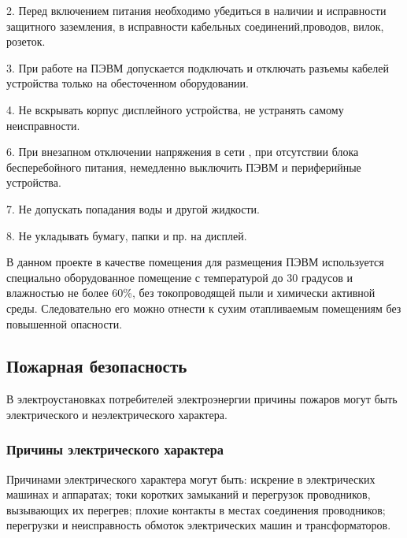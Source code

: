 \begin{par}
 	2. Перед включением питания необходимо убедиться в наличии и исправности
   защитного заземления, в исправности кабельных соединений,проводов,
   вилок, розеток.
\end{par}

\begin{par}
 	3. При работе на ПЭВМ допускается подключать и отключать разъемы 
    кабелей устройства только на обесточенном оборудовании.
\end{par}

\begin{par}
	4. Не вскрывать корпус дисплейного устройства, не устранять самому
    неисправности.
\end{par}

\begin{par}
	6. При внезапном отключении напряжения в сети , при отсутствии блока 
   бесперебойного питания, немедленно выключить ПЭВМ и периферийные
   устройства.
\end{par}

\begin{par}
	7. Не допускать попадания воды и другой жидкости.
\end{par}

\begin{par}
 	8. Не укладывать бумагу, папки и пр. на дисплей.
\end{par}


В данном проекте  в качестве помещения для размещения ПЭВМ используется 
специально оборудованное помещение с температурой до 30 градусов и 
влажностью не более 60\%, без токопроводящей пыли и химически
 активной среды. Следовательно его можно отнести к сухим отапливаемым помещениям без
повышенной опасности.


\subsection{Пожарная безопасность}
В электроустановках потребителей электроэнергии причины пожаров могут
быть электрического и неэлектрического характера.


\subsubsection{Причины электрического характера}
Причинами электрического характера могут быть: искрение в электрических
машинах и аппаратах; токи коротких замыканий и перегрузок проводников,
вызывающих их перегрев; плохие контакты в местах соединения проводников;
перегрузки и неисправность обмоток электрических машин и трансформаторов.


